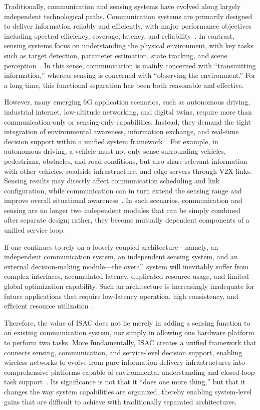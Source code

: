 Traditionally, communication and sensing systems have evolved along largely independent technological paths. Communication systems are primarily designed to deliver information reliably and efficiently, with major performance objectives including spectral efficiency, coverage, latency, and reliability~\cite{Goldsmith2005}. In contrast, sensing systems focus on understanding the physical environment, with key tasks such as target detection, parameter estimation, state tracking, and scene perception~\cite{SkolnikRadarBook}. In this sense, communication is mainly concerned with ``transmitting information,'' whereas sensing is concerned with ``observing the environment.'' For a long time, this functional separation has been both reasonable and effective.

However, many emerging 6G application scenarios, such as autonomous driving, industrial internet, low-altitude networking, and digital twins, require more than communication-only or sensing-only capabilities. Instead, they demand the tight integration of environmental awareness, information exchange, and real-time decision support within a unified system framework~\cite{Saad2020Vision6G,Gonzalez2024integrated,IMT2030Framework}. For example, in autonomous driving, a vehicle must not only sense surrounding vehicles, pedestrians, obstacles, and road conditions, but also share relevant information with other vehicles, roadside infrastructure, and edge servers through V2X links. Sensing results may directly affect communication scheduling and link configuration, while communication can in turn extend the sensing range and improve overall situational awareness~\cite{Zhang2020perceptive}. In such scenarios, communication and sensing are no longer two independent modules that can be simply combined after separate design; rather, they become mutually dependent components of a unified service loop.

If one continues to rely on a loosely coupled architecture---namely, an independent communication system, an independent sensing system, and an external decision-making module---the overall system will inevitably suffer from complex interfaces, accumulated latency, duplicated resource usage, and limited global optimization capability. Such an architecture is increasingly inadequate for future applications that require low-latency operation, high consistency, and efficient resource utilization~\cite{Cui2024integrated,Liu2020JointRadarComm}.

Therefore, the value of ISAC does not lie merely in adding a sensing function to an existing communication system, nor simply in allowing one hardware platform to perform two tasks. More fundamentally, ISAC creates a unified framework that connects sensing, communication, and service-level decision support, enabling wireless networks to evolve from pure information-delivery infrastructures into comprehensive platforms capable of environmental understanding and closed-loop task support~\cite{Liu2022ISAC,Gonzalez2024integrated}. Its significance is not that it ``does one more thing,'' but that it changes the way system capabilities are organized, thereby enabling system-level gains that are difficult to achieve with traditionally separated architectures.

